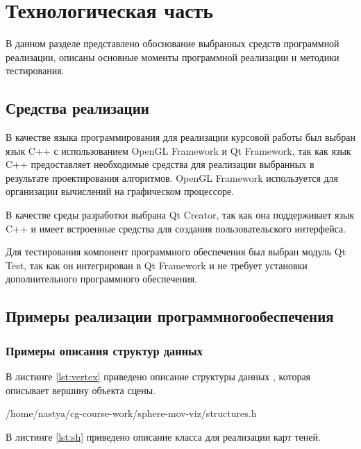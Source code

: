 \chapter{Технологическая часть}

В данном разделе представлено обоснование выбранных средств программной реализации, описаны основные моменты программной реализации и методики тестирования.

\section{Средства реализации}

В качестве языка программирования для реализации курсовой работы был выбран язык C++ с использованием OpenGL Framework и Qt Framework, так как язык C++ предоставляет необходимые средства для реализации выбранных в результате проектирования алгоритмов. OpenGL Framework используется для организации вычислений на графическом процессоре.

В качестве среды разработки выбрана Qt Creator, так как она поддерживает язык C++ и имеет встроенные средства для создания пользовательского интерфейса.

Для тестирования компонент программного обеспечения был выбран модуль Qt Test, так как он интегрирован в Qt Framework и не требует установки дополнительного программного обеспечения.

\section{Примеры реализации программного\newline обеспечения}

\subsection{Примеры описания структур данных}

В листинге \ref{lst:vertex} приведено описание структуры данных , которая описывает вершину объекта сцены.\pagebreak

\begin{lstinputlisting}[
	caption={Структура, описывающая вершину объекта},
	label={lst:vertex},
	style={cpp},
	linerange={8-16},
	]{/home/nastya/cg-course-work/sphere-mov-viz/structures.h}
\end{lstinputlisting}

В листинге \ref{lst:sh} приведено описание класса  для реализации карт теней.


